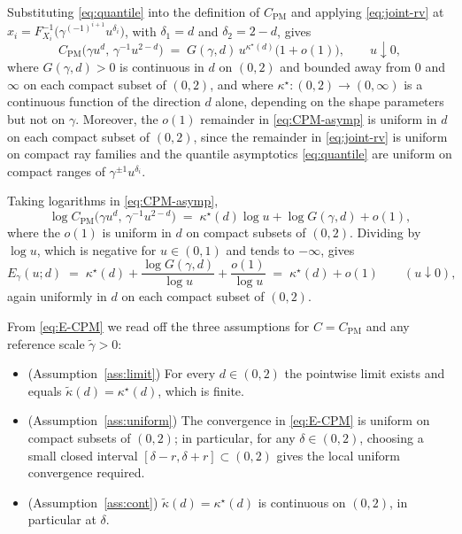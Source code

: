 \documentclass[11pt]{article}
\theoremstyle{definition}
\newcommand{\PM}{\mathrm{PM}}
\begin{document}
Substituting \eqref{eq:quantile} into the definition of $C_{\PM}$ and
applying \eqref{eq:joint-rv} at
$x_i=F_{X_i}^{-1}\!\bigl(\gamma^{(-1)^{i+1}}u^{\delta_i}\bigr)$, with
$\delta_1=d$ and $\delta_2=2-d$, gives
\begin{equation}\label{eq:CPM-asymp}
C_{\PM}\!\bigl(\gamma u^{d},\,\gamma^{-1}u^{2-d}\bigr)
\;=\;G(\gamma,d)\,u^{\kappa^\star(d)}\bigl(1+o(1)\bigr),
\qquad u\downarrow 0,
\end{equation}
where $G(\gamma,d)>0$ is continuous in $d$ on $(0,2)$ and bounded away
from $0$ and $\infty$ on each compact subset of $(0,2)$, and where
$\kappa^\star:(0,2)\to(0,\infty)$ is a continuous function of the
direction $d$ alone, depending on the shape parameters but not on
$\gamma$. Moreover, the $o(1)$ remainder in \eqref{eq:CPM-asymp} is
uniform in $d$ on each compact subset of $(0,2)$, since the
remainder in \eqref{eq:joint-rv} is uniform on compact ray families and
the quantile asymptotics \eqref{eq:quantile} are uniform on compact
ranges of $\gamma^{\pm 1}u^{\delta_i}$.

Taking logarithms in \eqref{eq:CPM-asymp},
\begin{equation}\label{eq:CPM-log}
\log C_{\PM}\!\bigl(\gamma u^{d},\,\gamma^{-1}u^{2-d}\bigr)
\;=\;\kappa^\star(d)\log u + \log G(\gamma,d) + o(1),
\end{equation}
where the $o(1)$ is uniform in $d$ on compact subsets of $(0,2)$. Dividing by
$\log u$, which is negative for $u\in(0,1)$ and tends to $-\infty$,
gives
\begin{equation}\label{eq:E-CPM}
E_\gamma(u;d)
\;=\;\kappa^\star(d) + \frac{\log G(\gamma,d)}{\log u} + \frac{o(1)}{\log u}
\;=\;\kappa^\star(d) + o(1)
\qquad (u\downarrow 0),
\end{equation}
again uniformly in $d$ on each compact subset of $(0,2)$.

From \eqref{eq:E-CPM} we read off the three assumptions for
$C=C_{\PM}$ and any reference scale $\tilde\gamma>0$:
\begin{itemize}[noitemsep,topsep=2pt]
\item (Assumption~\ref{ass:limit}) For every $d\in(0,2)$ the pointwise
limit exists and equals $\tilde\kappa(d)=\kappa^\star(d)$, which is
finite.
\item (Assumption~\ref{ass:uniform}) The convergence in \eqref{eq:E-CPM}
is uniform on compact subsets of $(0,2)$; in particular, for any
$\delta\in(0,2)$, choosing a small closed interval $[\delta-r,\delta+r]\subset(0,2)$
gives the local uniform convergence required.
\item (Assumption~\ref{ass:cont}) $\tilde\kappa(d)=\kappa^\star(d)$ is
continuous on $(0,2)$, in particular at $\delta$.
\end{itemize}
\end{document}
